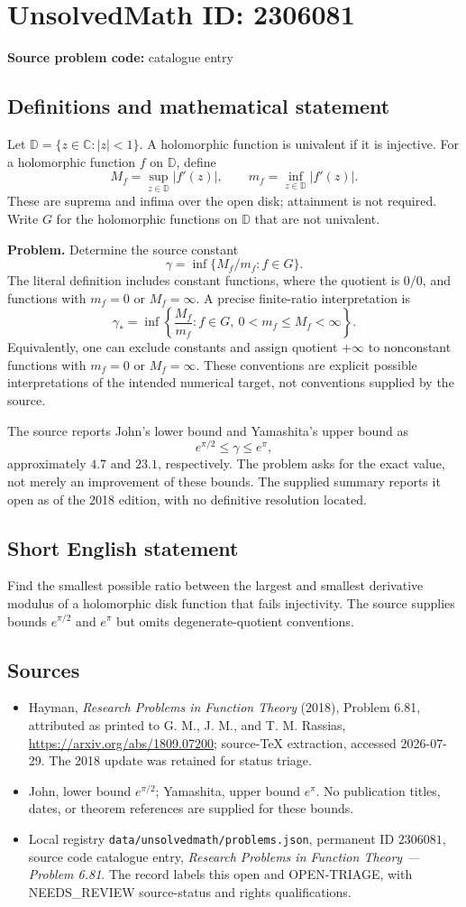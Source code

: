\documentclass[11pt]{article}
\begin{document}
\section*{UnsolvedMath ID: 2306081}
\textbf{Source problem code:} catalogue entry
\subsection{Definitions and mathematical statement}
Let $\mathbb D=\{z\in\mathbb C:|z|<1\}$. A holomorphic function is univalent if it is injective. For a holomorphic function $f$ on $\mathbb D$, define
\[
M_f=\sup_{z\in\mathbb D}|f'(z)|,\qquad
m_f=\inf_{z\in\mathbb D}|f'(z)|.
\]
These are suprema and infima over the open disk; attainment is not required. Write $G$ for the holomorphic functions on $\mathbb D$ that are not univalent.

\textbf{Problem.} Determine the source constant
\[
\gamma=\inf\{M_f/m_f:f\in G\}.
\]
The literal definition includes constant functions, where the quotient is $0/0$, and functions with $m_f=0$ or $M_f=\infty$. A precise finite-ratio interpretation is
\[
\gamma_* =\inf\left\{\frac{M_f}{m_f}:f\in G,\ 0<m_f\leq M_f<\infty\right\}.
\]
Equivalently, one can exclude constants and assign quotient $+\infty$ to nonconstant functions with $m_f=0$ or $M_f=\infty$. These conventions are explicit possible interpretations of the intended numerical target, not conventions supplied by the source.

The source reports John's lower bound and Yamashita's upper bound as
\[
e^{\pi/2}\leq\gamma\leq e^{\pi},
\]
approximately $4.7$ and $23.1$, respectively. The problem asks for the exact value, not merely an improvement of these bounds. The supplied summary reports it open as of the 2018 edition, with no definitive resolution located.
\subsection{Short English statement}
Find the smallest possible ratio between the largest and smallest derivative modulus of a holomorphic disk function that fails injectivity. The source supplies bounds $e^{\pi/2}$ and $e^\pi$ but omits degenerate-quotient conventions.
\subsection{Sources}
\begin{itemize}
\item Hayman, \emph{Research Problems in Function Theory} (2018), Problem 6.81, attributed as printed to G. M., J. M., and T. M. Rassias, \url{https://arxiv.org/abs/1809.07200}; source-TeX extraction, accessed 2026-07-29. The 2018 update was retained for status triage.
\item John, lower bound $e^{\pi/2}$; Yamashita, upper bound $e^\pi$. No publication titles, dates, or theorem references are supplied for these bounds.
\item Local registry \texttt{data/unsolvedmath/problems.json}, permanent ID $2306081$, source code catalogue entry, \emph{Research Problems in Function Theory --- Problem 6.81}. The record labels this open and OPEN-TRIAGE, with NEEDS\_REVIEW source-status and rights qualifications.
\end{itemize}
\end{document}
